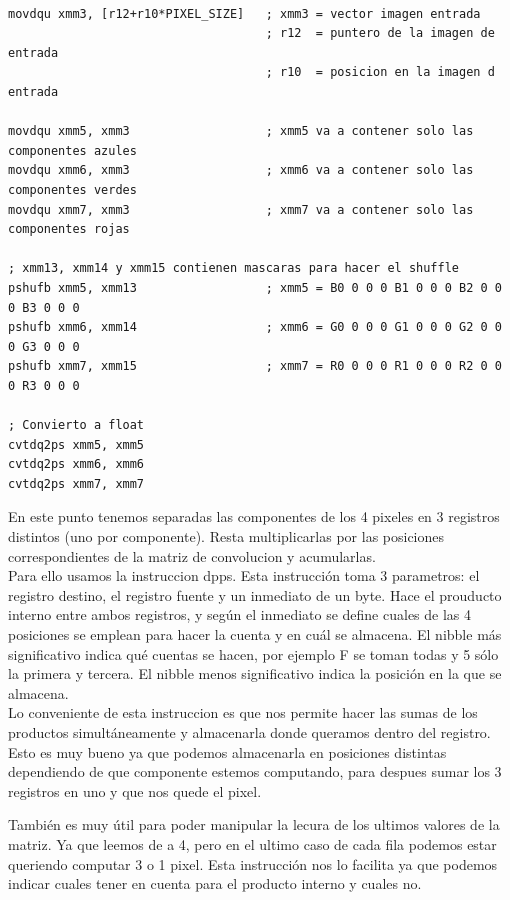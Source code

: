 \documentclass[10pt,a4paper,spanish]{article}
\begin{document}
\begin{codesnippet}
\begin{verbatim}

movdqu xmm3, [r12+r10*PIXEL_SIZE]   ; xmm3 = vector imagen entrada
                                    ; r12  = puntero de la imagen de entrada
                                    ; r10  = posicion en la imagen d entrada

movdqu xmm5, xmm3                   ; xmm5 va a contener solo las componentes azules
movdqu xmm6, xmm3                   ; xmm6 va a contener solo las componentes verdes
movdqu xmm7, xmm3                   ; xmm7 va a contener solo las componentes rojas

; xmm13, xmm14 y xmm15 contienen mascaras para hacer el shuffle
pshufb xmm5, xmm13                  ; xmm5 = B0 0 0 0 B1 0 0 0 B2 0 0 0 B3 0 0 0
pshufb xmm6, xmm14                  ; xmm6 = G0 0 0 0 G1 0 0 0 G2 0 0 0 G3 0 0 0
pshufb xmm7, xmm15                  ; xmm7 = R0 0 0 0 R1 0 0 0 R2 0 0 0 R3 0 0 0

; Convierto a float
cvtdq2ps xmm5, xmm5
cvtdq2ps xmm6, xmm6
cvtdq2ps xmm7, xmm7

\end{verbatim}
\end{codesnippet}

En este punto tenemos separadas las componentes de los 4 pixeles en 3 registros distintos (uno por componente). Resta multiplicarlas por las posiciones correspondientes de la matriz de convolucion y acumularlas. \\

Para ello usamos la instruccion dpps. Esta instrucción toma 3 parametros: el registro destino, el registro fuente y un inmediato de un byte. Hace el prouducto interno entre ambos registros, y según el inmediato se define cuales de las 4 posiciones se emplean para hacer la cuenta y en cuál se almacena. El nibble más significativo indica qué cuentas se hacen, por ejemplo F se toman todas y 5 sólo la primera y tercera. El nibble menos significativo indica la posición en la que se almacena. \\

Lo conveniente de esta instruccion es que nos permite hacer las sumas de los productos simultáneamente y almacenarla donde queramos dentro del registro. Esto es muy bueno ya que podemos almacenarla en posiciones distintas dependiendo de que componente estemos computando, para despues sumar los 3 registros en uno y que nos quede el pixel.

También es muy útil para poder manipular la lecura de los ultimos valores de la matriz. Ya que leemos de a 4, pero en el ultimo caso de cada fila podemos estar queriendo computar 3 o 1 pixel. Esta instrucción nos lo facilita ya que podemos indicar cuales tener en cuenta para el producto interno y cuales no. \\
\end{document}

